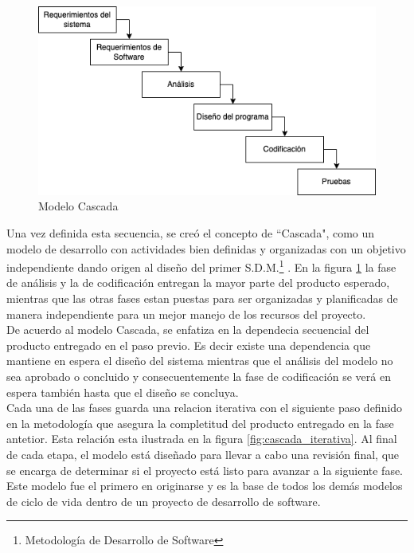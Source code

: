 \begin{figure}[H]
    \begin{center}
        \includegraphics[width=12cm]{img/capitulo_2/cascada2.png}
    \end{center}
    \caption{Modelo Cascada}
    \label{fig:cascada}
\end{figure}

Una vez definida esta secuencia, se creó el concepto de ``Cascada", como un modelo de desarrollo con actividades bien definidas y organizadas con un objetivo independiente dando origen al diseño del primer S.D.M.\footnote{Metodología de Desarrollo de Software} \cite{Bell&Thayer}. En la figura \ref{fig:cascada} la fase de análisis y la de codificación entregan la mayor parte del producto esperado, mientras que las otras fases estan puestas para ser organizadas y planificadas de manera independiente para un mejor manejo de los recursos del proyecto.\\

De acuerdo al modelo Cascada, se enfatiza en la dependecia secuencial del producto entregado en el paso previo. Es decir existe una dependencia que mantiene en espera el diseño del sistema mientras que el análisis del modelo no sea aprobado o concluido y consecuentemente la fase de codificación se verá en espera también hasta que el diseño se concluya.\\

Cada una de las fases guarda una relacion iterativa con el siguiente paso definido en la metodología que asegura la completitud del producto entregado en la fase antetior. Esta relación esta ilustrada en la figura \ref{fig:cascada_iterativa}. Al final de cada etapa, el modelo está diseñado para llevar a cabo una revisión final, que se encarga de determinar si el proyecto está listo para avanzar a la siguiente fase. Este modelo fue el primero en originarse y es la base de todos los demás modelos de ciclo de vida dentro de un proyecto de desarrollo de software.\\

